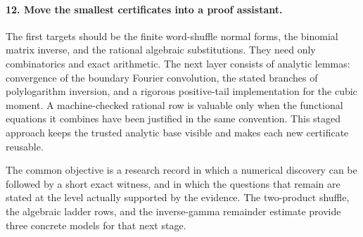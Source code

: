 \paragraph{12. Move the smallest certificates into a proof assistant.}
The first targets should be the finite word-shuffle normal forms,
the binomial matrix inverse, and the rational algebraic substitutions.
They need only combinatorics and exact arithmetic.
The next layer consists of analytic lemmas: convergence of the
boundary Fourier convolution, the stated branches of polylogarithm
inversion, and a rigorous positive-tail implementation for the cubic
moment. A machine-checked rational row is valuable only when the
functional equations it combines have been justified in the same
convention. This staged approach keeps the trusted analytic base
visible and makes each new certificate reusable.

The common objective is a research record in which a numerical
discovery can be followed by a short exact witness, and in which the
questions that remain are stated at the level actually supported
by the evidence. The two-product shuffle, the algebraic ladder rows,
and the inverse-gamma remainder estimate provide three concrete
models for that next stage.
